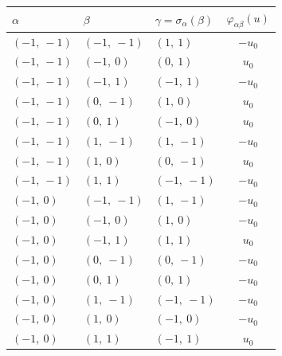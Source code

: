 \documentclass[11pt]{article}
\newcommand{\noi}{\noindent}
\theoremstyle{definition}
\begin{document}
\noi \noindent \begin{longtable}{|l|l|l|c|}
    \hline
    \textbf{$\alpha$} & \textbf{$\beta$} & \textbf{$\gamma = \sigma_{\alpha}(\beta)$} & $\varphi_{\alpha\beta}(u)$ \\
    \hline
    \endhead
    $\left( -1, \  -1\right)$ & $\left( -1, \  -1\right)$ & $\left( 1, \  1\right)$ & $- u_{0}$ \\
    \hline
    $\left( -1, \  -1\right)$ & $\left( -1, \  0\right)$ & $\left( 0, \  1\right)$ & $u_{0}$ \\
    \hline
    $\left( -1, \  -1\right)$ & $\left( -1, \  1\right)$ & $\left( -1, \  1\right)$ & $- u_{0}$ \\
    \hline
    $\left( -1, \  -1\right)$ & $\left( 0, \  -1\right)$ & $\left( 1, \  0\right)$ & $u_{0}$ \\
    \hline
    $\left( -1, \  -1\right)$ & $\left( 0, \  1\right)$ & $\left( -1, \  0\right)$ & $u_{0}$ \\
    \hline
    $\left( -1, \  -1\right)$ & $\left( 1, \  -1\right)$ & $\left( 1, \  -1\right)$ & $- u_{0}$ \\
    \hline
    $\left( -1, \  -1\right)$ & $\left( 1, \  0\right)$ & $\left( 0, \  -1\right)$ & $u_{0}$ \\
    \hline
    $\left( -1, \  -1\right)$ & $\left( 1, \  1\right)$ & $\left( -1, \  -1\right)$ & $- u_{0}$ \\
    \hline
    $\left( -1, \  0\right)$ & $\left( -1, \  -1\right)$ & $\left( 1, \  -1\right)$ & $- u_{0}$ \\
    \hline
    $\left( -1, \  0\right)$ & $\left( -1, \  0\right)$ & $\left( 1, \  0\right)$ & $- u_{0}$ \\
    \hline
    $\left( -1, \  0\right)$ & $\left( -1, \  1\right)$ & $\left( 1, \  1\right)$ & $u_{0}$ \\
    \hline
    $\left( -1, \  0\right)$ & $\left( 0, \  -1\right)$ & $\left( 0, \  -1\right)$ & $- u_{0}$ \\
    \hline
    $\left( -1, \  0\right)$ & $\left( 0, \  1\right)$ & $\left( 0, \  1\right)$ & $- u_{0}$ \\
    \hline
    $\left( -1, \  0\right)$ & $\left( 1, \  -1\right)$ & $\left( -1, \  -1\right)$ & $- u_{0}$ \\
    \hline
    $\left( -1, \  0\right)$ & $\left( 1, \  0\right)$ & $\left( -1, \  0\right)$ & $- u_{0}$ \\
    \hline
    $\left( -1, \  0\right)$ & $\left( 1, \  1\right)$ & $\left( -1, \  1\right)$ & $u_{0}$ \\

\end{longtable}
\end{document}
